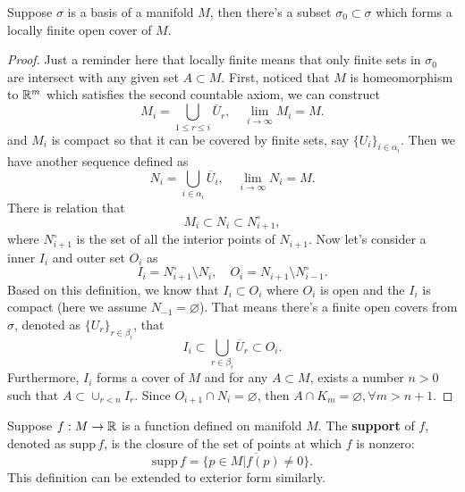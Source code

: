 \begin{theorem}
Suppose $\sigma$ is a basis of a manifold $M$, then there's a subset $\sigma_0\subset \sigma$ which forms a locally finite open cover of $M$.
\end{theorem}\label{theorem:locally_finite_subcover}
\begin{proof}
Just a reminder here that locally finite means that only finite sets in $\sigma_0$ are intersect with any given set $A\subset M$.
First, noticed that $M$ is homeomorphism to $\mathbb{R}^m$ which satisfies the second countable axiom, we can construct
\begin{equation}
M_i=\bigcup_{1\le r\le i}\overline{U}_r,\quad \lim_{i\to\infty}M_i=M.
\end{equation}
and $M_i$ is compact so that it can be covered by finite sets, say $\{U_i\}_{i\in\alpha_i}$. Then we have another sequence defined as 
\begin{equation}
N_i=\bigcup_{i\in\alpha_i}\overline{U}_{i},\quad \lim_{i\to\infty}N_i=M.
\end{equation}
There is relation that
\begin{equation}
M_i\subset N_i\subset N_{i+1}^\circ,
\end{equation}
where $N_{i+1}^\circ$ is the set of all the interior points of $N_{i+1}$. Now let's consider a inner $I_i$ and outer set $O_i$ as
\begin{equation}
I_i=N^\circ_{i+1}\setminus N_i,\quad O_i=N_{i+1}\setminus N^\circ_{i-1}.
\end{equation}
Based on this definition, we know that $I_i\subset O_i$ where $O_i$ is open and the $I_i$ is compact (here we assume $N_{-1}=\varnothing$). That means there's a finite open covers from $\sigma$, denoted as $\{U_r\}_{r\in\beta_i}$, that 
\begin{equation}
I_i\subset\bigcup_{r\in\beta_i}\overline{U}_r\subset O_i.
\end{equation}
Furthermore, $I_i$ forms a cover of $M$ and for any $A\subset M$, exists a number $n>0$ such that $A\subset \cup_{r<n}I_r$. Since $O_{i+1}\cap N_i=\varnothing$, then $A\cap K_{m}=\varnothing,\forall m>n+1$. 
\end{proof}

\begin{definition}
Suppose $f:M\to\mathbb{R}$ is a function defined on manifold $M$. The \textbf{support} of $f$, denoted as $\text{supp}\,f$, is the closure of the set of points at which $f$ is nonzero:
\begin{equation}
\text{supp}\,f=\overline{\{p\in M|f(p)\ne0\}}.
\end{equation}
This definition can be extended to exterior form similarly.
\end{definition}

